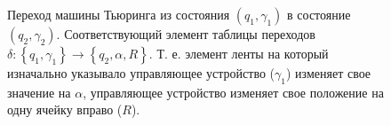 \begin{figure}
\centering



\caption{Переход машины Тьюринга из состояния $(q_1, \gamma_1)$ в
  состояние $(q_2, \gamma_2)$. Соответствующий элемент таблицы
  переходов $\delta: \left\{q_1, \gamma_1\right\} \rightarrow
  \left\{q_2, \alpha, R\right\}$. Т. е. элемент ленты на который
  изначально указывало управляющее устройство ($\gamma_1$) изменяет
  свое значение на $\alpha$, управляющее устройство изменяет свое
  положение на одну ячейку вправо ($R$).} 
\label{figAddAlgoTuringTrans}
\end{figure}
